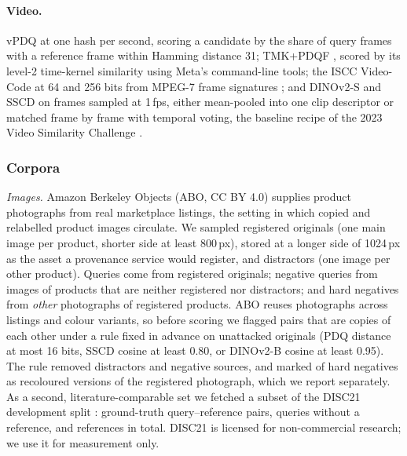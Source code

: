 \paragraph{Video.} vPDQ \cite{meta_vpdq} at one hash per second, scoring a candidate by the share of query frames with a reference frame within Hamming distance 31; TMK+PDQF \cite{meta2019pdq, poullot2015tmk}, scored by its level-2 time-kernel similarity using Meta's command-line tools; the ISCC Video-Code at 64 and 256 bits from MPEG-7 frame signatures \cite{paschalakis2012mpeg7}; and DINOv2-S and SSCD on frames sampled at 1\,fps, either mean-pooled into one clip descriptor or matched frame by frame with temporal voting, the baseline recipe of the 2023 Video Similarity Challenge \cite{pizzi2024vsc}.



\subsubsection{Corpora}
\emph{Images.} Amazon Berkeley Objects (ABO, CC BY 4.0) \cite{collins2022abo} supplies product photographs from real marketplace listings, the setting in which copied and relabelled product images circulate. We sampled  registered originals (one main image per product, shorter side at least 800\,px), stored at a longer side of 1024\,px as the asset a provenance service would register, and  distractors (one image per other product). Queries come from  registered originals; negative queries from  images of products that are neither registered nor distractors; and hard negatives from  \emph{other} photographs of registered products. ABO reuses photographs across listings and colour variants, so before scoring we flagged pairs that are copies of each other under a rule fixed in advance on unattacked originals (PDQ distance at most 16 bits, SSCD cosine at least 0.80, or DINOv2-B cosine at least 0.95). The rule removed  distractors and  negative sources, and marked  of  hard negatives as recoloured versions of the registered photograph, which we report separately. As a second, literature-comparable set we fetched a subset of the DISC21 development split \cite{douze2021isc}:  ground-truth query--reference pairs,  queries without a reference, and  references in total. DISC21 is licensed for non-commercial research; we use it for measurement only.

